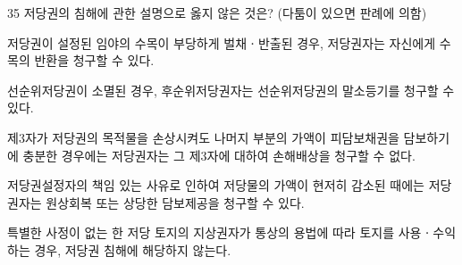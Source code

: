 \begin{question}{35}
저당권의 침해에 관한 설명으로 옳지 않은 것은? (다툼이 있으면 판례에 의함)
\begin{choices}
  \item 저당권이 설정된 임야의 수목이 부당하게 벌채ㆍ반출된 경우, 저당권자는 자신에게 수목의 반환을 청구할 수 있다.
  \item 선순위저당권이 소멸된 경우, 후순위저당권자는 선순위저당권의 말소등기를 청구할 수 있다.
  \item 제3자가 저당권의 목적물을 손상시켜도 나머지 부분의 가액이 피담보채권을 담보하기에 충분한 경우에는 저당권자는 그 제3자에 대하여 손해배상을 청구할 수 없다.
  \item 저당권설정자의 책임 있는 사유로 인하여 저당물의 가액이 현저히 감소된 때에는 저당권자는 원상회복 또는 상당한 담보제공을 청구할 수 있다.
  \item 특별한 사정이 없는 한 저당 토지의 지상권자가 통상의 용법에 따라 토지를 사용ㆍ수익하는 경우, 저당권 침해에 해당하지 않는다.
\end{choices}
\end{question}
